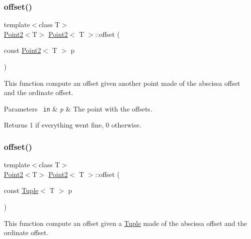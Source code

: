 \subsubsection{\texorpdfstring{offset()}{offset()}\hspace{0.1cm}{\footnotesize\ttfamily [2/3]}}
{\footnotesize\ttfamily template$<$class T$>$ \\
\mbox{\hyperlink{class_point2}{Point2}}$<$T$>$ \mbox{\hyperlink{class_point2}{Point2}}$<$ T $>$\+::offset (\begin{DoxyParamCaption}\item[{const \mbox{\hyperlink{class_point2}{Point2}}$<$ T $>$}]{p }\end{DoxyParamCaption})\hspace{0.3cm}{\ttfamily [inline]}}



This function compute an offset given another point made of the abscissa offset and the ordinate offset. 


\begin{DoxyParams}[1]{Parameters}
\mbox{\texttt{ in}}  & {\em p} & The point with the offsets. \\
\hline
\end{DoxyParams}
\begin{DoxyReturn}{Returns}
1 if everything went fine, 0 otherwise. 
\end{DoxyReturn}
\mbox{\label{class_point2_afaa5aa2f9bff328766572129db789059}} 
\subsubsection{\texorpdfstring{offset()}{offset()}\hspace{0.1cm}{\footnotesize\ttfamily [3/3]}}
{\footnotesize\ttfamily template$<$class T$>$ \\
\mbox{\hyperlink{class_point2}{Point2}}$<$T$>$ \mbox{\hyperlink{class_point2}{Point2}}$<$ T $>$\+::offset (\begin{DoxyParamCaption}\item[{const \mbox{\hyperlink{class_tuple}{Tuple}}$<$ T $>$}]{p }\end{DoxyParamCaption})\hspace{0.3cm}{\ttfamily [inline]}}



This function compute an offset given a {\ttfamily \mbox{\hyperlink{class_tuple}{Tuple}}} made of the abscissa offset and the ordinate offset. 


